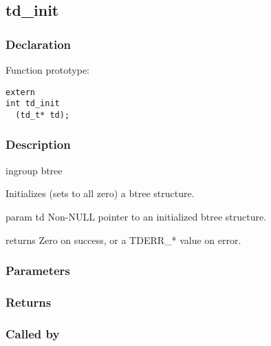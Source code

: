 
\newpage
\subsection{td\_init}
\subsubsection{Declaration} Function prototype:

\begin{verbatim}
extern
int td_init
  (td_t* td);
\end{verbatim}

\subsubsection{Description}


 ingroup btree

 Initializes (sets to all zero) a btree structure.

 param td Non-NULL pointer to an initialized btree structure.

 returns Zero on success, or a TDERR\_* value on error.
 

\subsubsection{Parameters}
\subsubsection{Returns}
\subsubsection{Called by}
